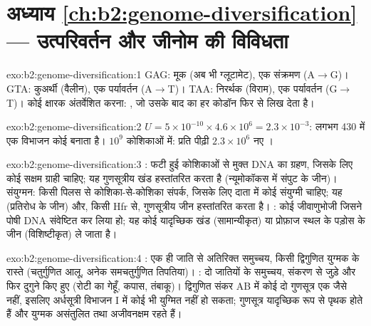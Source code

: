 \section*{अध्याय \ref{ch:b2:genome-diversification} --- उत्परिवर्तन और जीनोम की विविधता}

\begin{solution}{exo:b2:genome-diversification:1}
GAG: मूक (अब भी ग्लूटामेट), एक संक्रमण (A$\to$G)। GTA: कुअर्थी
(वैलीन), एक पर्यावर्तन (A$\to$T)। TAA: निरर्थक (विराम), एक
पर्यावर्तन (G$\to$T)। कोई क्षारक अंतर्वेशित करना: , जो
उसके बाद का हर कोडॉन फिर से लिख देता है।
\end{solution}

\begin{solution}{exo:b2:genome-diversification:2}
$U = 5\times 10^{-10}\times 4.6\times 10^{6} = 2.3\times 10^{-3}$:
लगभग 430 में एक विभाजन कोई  बनाता है। $10^{9}$ कोशिकाओं में:
प्रति पीढ़ी $2.3\times 10^{6}$ नए ।
\end{solution}

\begin{solution}{exo:b2:genome-diversification:3}
: फटी हुई कोशिकाओं से मुक्त DNA का ग्रहण, जिसके लिए कोई सक्षम
ग्राही चाहिए; यह गुणसूत्रीय खंड हस्तांतरित करता है (न्यूमोकॉकस में संपुट
के जीन)। संयुग्मन: किसी पिलस से कोशिका-से-कोशिका संपर्क, जिसके लिए दाता
में कोई संयुग्मी  चाहिए; यह 
(प्रतिरोध के जीन) और, किसी Hfr से, गुणसूत्रीय जीन हस्तांतरित करता है। :
कोई जीवाणुभोजी जिसने पोषी DNA संवेष्टित कर लिया हो; यह कोई यादृच्छिक खंड
(सामान्यीकृत) या प्रोफ़ाज स्थल के पड़ोस के जीन (विशिष्टीकृत) ले जाता है।
\end{solution}

\begin{solution}{exo:b2:genome-diversification:4}
: एक ही जाति से अतिरिक्त समुच्चय, किसी द्विगुणित युग्मक के
रास्ते (चतुर्गुणित आलू, अनेक समचतुर्गुणित तिपतिया)। : दो
जातियों के समुच्चय, संकरण से जुड़े और फिर दुगुने किए हुए
(रोटी का गेहूँ, कपास, तंबाकू)। द्विगुणित संकर AB में कोई दो गुणसूत्र एक
जैसे नहीं, इसलिए अर्धसूत्री विभाजन I में कोई भी युग्मित नहीं हो सकता;
गुणसूत्र यादृच्छिक रूप से पृथक होते हैं और युग्मक असंतुलित तथा अजीवनक्षम
रहते हैं।
\end{solution}

